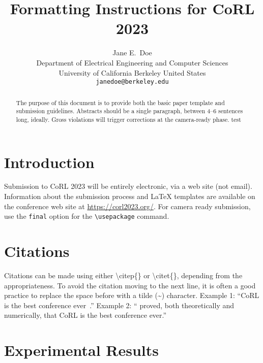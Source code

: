 \documentclass{article}
\title{Formatting Instructions for CoRL 2023}
\author{
  Jane E.~Doe\\
  Department of Electrical Engineering and Computer Sciences\\
  University of California Berkeley 
  United States\\
  \texttt{janedoe@berkeley.edu} \\
}
\begin{document}
\maketitle


\begin{abstract}
	The purpose of this document is to provide both the basic paper template and submission guidelines. Abstracts should be a single paragraph, between 4--6 sentences long, ideally. Gross violations will trigger corrections at the camera-ready phase.
	test
\end{abstract}



\section{Introduction}

Submission to CoRL 2023 will be entirely electronic, via a web site (not email). Information about the submission process and \LaTeX{} templates are available on the conference web site at \url{https://corl2023.org/}. For camera ready submission, use the \texttt{final} option for the \texttt{\textbackslash usepackage} command.


\section{Citations}
\label{sec:citations}

Citations can be made using either \textbackslash citep\{\} or \textbackslash citet\{\}, depending from the appropriateness. To avoid the citation moving to the next line, it is often a good practice to replace the space before with a tilde (\~{}) character.
Example 1: ``CoRL is the best conference ever~\citep{Gauss1857}.''
Example 2: ``\citet{Lagrange1788} proved, both theoretically and numerically, that CoRL is the best conference ever.''


\section{Experimental Results}
\label{sec:result}
\end{document}
